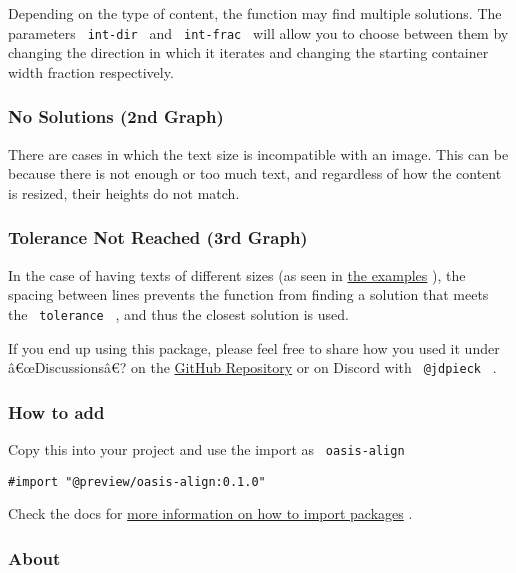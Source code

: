 Depending on the type of content, the function may find multiple
solutions. The parameters \texttt{\ int-dir\ } and \texttt{\ int-frac\ }
will allow you to choose between them by changing the direction in which
it iterates and changing the starting container width fraction
respectively.

\subsubsection{No Solutions (2nd Graph)}\label{no-solutions-2nd-graph}

There are cases in which the text size is incompatible with an image.
This can be because there is not enough or too much text, and regardless
of how the content is resized, their heights do not match.

\subsubsection{Tolerance Not Reached (3rd
Graph)}\label{tolerance-not-reached-3rd-graph}

In the case of having texts of different sizes (as seen in
\href{https://github.com/typst/packages/raw/main/packages/preview/oasis-align/0.1.0/\#text-with-text}{the
examples} ), the spacing between lines prevents the function from
finding a solution that meets the \texttt{\ tolerance\ } , and thus the
closest solution is used.

If you end up using this package, please feel free to share how you used
it under â€œDiscussionsâ€? on the
\href{https://github.com/jdpieck/oasis-align}{GitHub Repository} or on
Discord with \texttt{\ @jdpieck\ } .

\subsubsection{How to add}\label{how-to-add}

Copy this into your project and use the import as
\texttt{\ oasis-align\ }

\begin{verbatim}
#import "@preview/oasis-align:0.1.0"
\end{verbatim}



Check the docs for
\href{https://typst.app/docs/reference/scripting/\#packages}{more
information on how to import packages} .

\subsubsection{About}\label{about}

